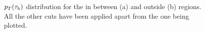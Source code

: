 \begin{figure}[ht]
	\centering
	\hfill
	\caption{$p_T(\tau_\text{h})$ distribution for the in between (a) and outside (b) regions. All the other cuts have been applied apart from the one being plotted.}
	\label{Fig12}
\end{figure} 

